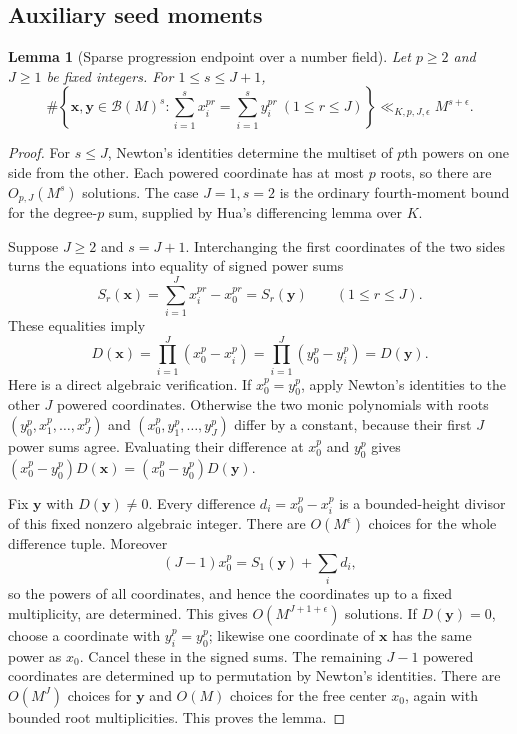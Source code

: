 \documentclass[11pt]{amsart}
\newtheorem{lemma}[theorem]{Lemma}
\theoremstyle{definition}
\numberwithin{equation}{section}
\begin{document}
\subsection{Auxiliary seed moments}
\begin{lemma}[Sparse progression endpoint over a number field]
\label{lem:field-sparse-endpoint}
Let $p\ge2$ and $J\ge1$ be fixed integers. For $1\le s\le J+1$,
\[
 \#\left\{\mathbf x,\mathbf y\in\mathcal B(M)^s:
       \sum_{i=1}^s x_i^{pr}=\sum_{i=1}^s y_i^{pr}\ (1\le r\le J)\right\}
 \ll_{K,p,J,\epsilon} M^{s+\epsilon}.
\]
\end{lemma}
\begin{proof}
For $s\le J$, Newton's identities determine the multiset of $p$th powers
on one side from the other. Each powered coordinate has at most $p$ roots,
so there are $O_{p,J}(M^s)$ solutions. The case $J=1,s=2$ is the ordinary
fourth-moment bound for the degree-$p$ sum, supplied by Hua's differencing
lemma over $K$.

Suppose $J\ge2$ and $s=J+1$. Interchanging the first coordinates of the two
sides turns the equations into equality of signed power sums
\[
 S_r(\mathbf x)=\sum_{i=1}^J x_i^{pr}-x_0^{pr}
             =S_r(\mathbf y)\qquad(1\le r\le J).
\]
These equalities imply
\[
 D(\mathbf x)=\prod_{i=1}^J(x_0^p-x_i^p)
             =\prod_{i=1}^J(y_0^p-y_i^p)=D(\mathbf y).
\]
Here is a direct algebraic verification. If $x_0^p=y_0^p$, apply Newton's
identities to the other $J$ powered coordinates. Otherwise the two monic
polynomials with roots $(y_0^p,x_1^p,\ldots,x_J^p)$ and
$(x_0^p,y_1^p,\ldots,y_J^p)$ differ by a constant, because their first $J$
power sums agree. Evaluating their difference at $x_0^p$ and $y_0^p$ gives
$(x_0^p-y_0^p)D(\mathbf x)=(x_0^p-y_0^p)D(\mathbf y)$.

Fix $\mathbf y$ with $D(\mathbf y)\ne0$. Every difference
$d_i=x_0^p-x_i^p$ is a bounded-height divisor of this fixed nonzero algebraic
integer. There are $O(M^\epsilon)$ choices for the whole difference tuple.
Moreover
\[
 (J-1)x_0^p=S_1(\mathbf y)+\sum_i d_i,
\]
so the powers of all coordinates, and hence the coordinates up to a fixed
multiplicity, are determined. This gives $O(M^{J+1+\epsilon})$ solutions.
If $D(\mathbf y)=0$, choose a coordinate with $y_i^p=y_0^p$; likewise one
coordinate of $\mathbf x$ has the same power as $x_0$.
Cancel these in the signed sums. The remaining $J-1$ powered coordinates
are determined up to permutation by Newton's identities. There are
$O(M^J)$ choices for $\mathbf y$ and $O(M)$ choices for the free center
$x_0$, again with bounded root multiplicities. This proves the lemma.
\end{proof}
\end{document}
